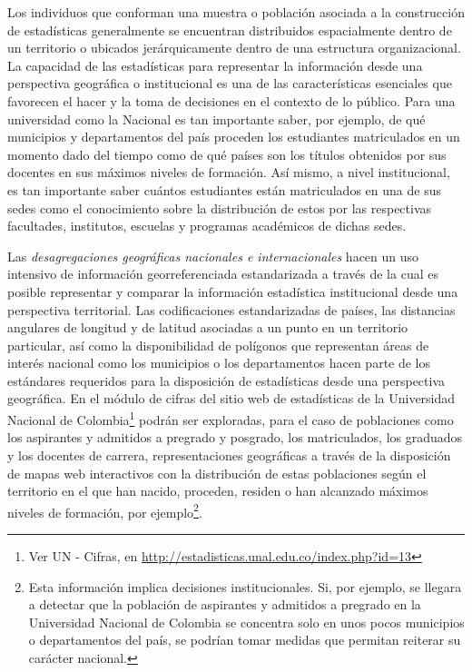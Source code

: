 \documentclass[
]{book}
\begin{document}
Los individuos que conforman una muestra o población asociada a la construcción de estadísticas generalmente se encuentran distribuidos espacialmente dentro de un territorio o ubicados jerárquicamente dentro de una estructura organizacional. La capacidad de las estadísticas para representar la información desde una perspectiva geográfica o institucional es una de las características esenciales que favorecen el hacer y la toma de decisiones en el contexto de lo público. Para una universidad como la Nacional es tan importante saber, por ejemplo, de qué municipios y departamentos del país proceden los estudiantes matriculados en un momento dado del tiempo como de qué países son los títulos obtenidos por sus docentes en sus máximos niveles de formación. Así mismo, a nivel institucional, es tan importante saber cuántos estudiantes están matriculados en una de sus sedes como el conocimiento sobre la distribución de estos por las respectivas facultades, institutos, escuelas y programas académicos de dichas sedes.

Las \emph{desagregaciones geográficas nacionales e internacionales} hacen un uso intensivo de información georreferenciada estandarizada a través de la cual es posible representar y comparar la información estadística institucional desde una perspectiva territorial. Las codificaciones estandarizadas de países, las distancias angulares de longitud y de latitud asociadas a un punto en un territorio particular, así como la disponibilidad de polígonos que representan áreas de interés nacional como los municipios o los departamentos hacen parte de los estándares requeridos para la disposición de estadísticas desde una perspectiva geográfica. En el módulo de cifras del sitio web de estadísticas de la Universidad Nacional de Colombia\footnote{Ver UN - Cifras, en \url{http://estadisticas.unal.edu.co/index.php?id=13}} podrán ser exploradas, para el caso de poblaciones como los aspirantes y admitidos a pregrado y posgrado, los matriculados, los graduados y los docentes de carrera, representaciones geográficas a través de la disposición de mapas web interactivos con la distribución de estas poblaciones según el territorio en el que han nacido, proceden, residen o han alcanzado máximos niveles de formación, por ejemplo\footnote{Esta información implica decisiones institucionales. Si, por ejemplo, se llegara a detectar que la población de aspirantes y admitidos a pregrado en la Universidad Nacional de Colombia se concentra solo en unos pocos municipios o departamentos del país, se podrían tomar medidas que permitan reiterar su carácter nacional.}.
\end{document}
